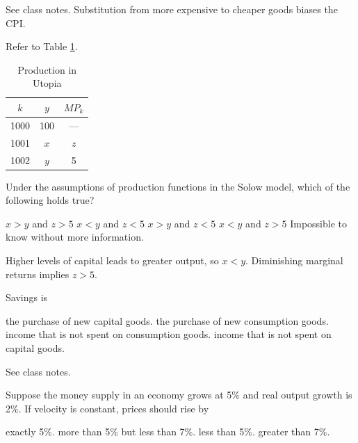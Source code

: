 \documentclass[addpoints,11pt]{exam}
\theoremstyle{definition}
\begin{document}
\begin{questions}
	\begin{solution} 
		See class notes. Substitution from more expensive to cheaper goods biases the CPI.
	\end{solution}
	
\question Refer to Table \ref{tab3}. 
		
		\begin{table}[H]
			\centering
			\caption{Production in Utopia}
			\label{tab3}
			\begin{tabular}{c|c|c}        
				
				$k$ & $y$ & $MP_k$ \\
				\hline
				1000 & 100 & --- \\
				1001 & $x$ & $z$ \\
				1002 & $y$ & 5 \\
			
			\end{tabular}
		\end{table}
		
		Under the assumptions of production functions in the Solow model, which of the following holds true?
		
		\begin{choices}
				\choice $x>y$ and $z>5$
				\choice $x<y$ and $z<5$
				\choice $x>y$ and $z<5$
				\CorrectChoice $x<y$ and $z>5$
				\choice Impossible to know without more information.
		\end{choices}
		
	\begin{solution} 
		Higher levels of capital leads to greater output, so $x<y$. Diminishing marginal returns implies $z>5$.
	\end{solution}
	
	\question Savings is 
	
	\begin{choices}
		\choice the purchase of new capital goods.
		\choice the purchase of new consumption goods.
		\CorrectChoice income that is not spent on consumption goods.
		\choice income that is not spent on capital goods.
	\end{choices}
	
	\begin{solution}
		 See class notes.
	\end{solution}
	
	\question Suppose the money supply in an economy grows at 5\% and real output growth is 2\%. If velocity is constant, prices should rise by 
	
	\begin{choices}
		\choice exactly 5\%.
		\choice more than 5\% but less than 7\%.
		\CorrectChoice less than 5\%.
		\choice greater than 7\%.
	\end{choices}
	

\end{questions}
\end{document}
